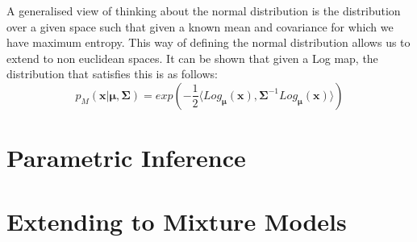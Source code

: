 \documentclass{article}
\begin{document}
A generalised view of thinking about the normal distribution is the distribution over a given space such that given a known mean and covariance for which we have maximum entropy.
This way of defining the normal distribution allows us to extend to non euclidean spaces.
It can be shown that given a Log map, the distribution that satisfies this is as follows:
$$p_M(\bm{x}|\bm{\mu},\bm{\Sigma}) = exp(-\frac{1}{2}\langle Log_{\bm{\mu}}(\bm{x}),
\bm{\Sigma}^{-1}Log_{\bm{\mu}}(\bm{x})\rangle)$$
\section{Parametric Inference}
\section{Extending to Mixture Models}
\end{document}
